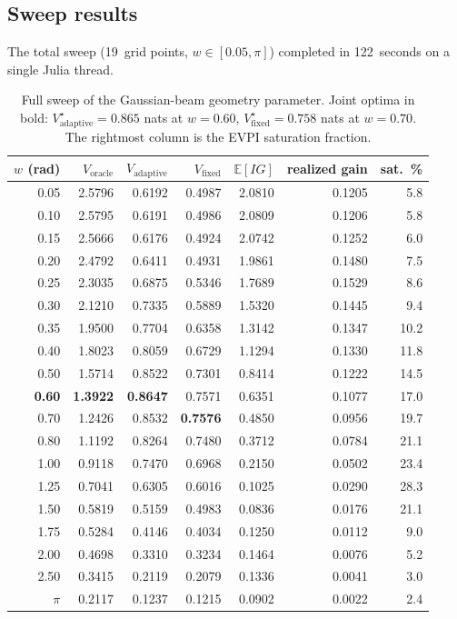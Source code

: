 \documentclass[11pt,a4paper]{article}
\newcommand{\E}{\mathbb{E}}
\begin{document}
\subsection{Sweep results}

The total sweep (19~grid points, $w \in [0.05, \pi]$) completed in 122~seconds on a single Julia thread.

\begin{table}[h!]
\centering
\begin{tabular}{@{}rrrrrrr@{}}
\toprule
$w$ (rad) & $V_{\text{oracle}}$ & $V_{\text{adaptive}}$ & $V_{\text{fixed}}$ & $\E[IG]$ & realized gain & sat.\ \% \\
\midrule
0.05 & 2.5796 & 0.6192 & 0.4987 & 2.0810 & 0.1205 & 5.8 \\
0.10 & 2.5795 & 0.6191 & 0.4986 & 2.0809 & 0.1206 & 5.8 \\
0.15 & 2.5666 & 0.6176 & 0.4924 & 2.0742 & 0.1252 & 6.0 \\
0.20 & 2.4792 & 0.6411 & 0.4931 & 1.9861 & 0.1480 & 7.5 \\
0.25 & 2.3035 & 0.6875 & 0.5346 & 1.7689 & 0.1529 & 8.6 \\
0.30 & 2.1210 & 0.7335 & 0.5889 & 1.5320 & 0.1445 & 9.4 \\
0.35 & 1.9500 & 0.7704 & 0.6358 & 1.3142 & 0.1347 & 10.2 \\
0.40 & 1.8023 & 0.8059 & 0.6729 & 1.1294 & 0.1330 & 11.8 \\
0.50 & 1.5714 & 0.8522 & 0.7301 & 0.8414 & 0.1222 & 14.5 \\
\textbf{0.60} & \textbf{1.3922} & \textbf{0.8647} & 0.7571 & 0.6351 & 0.1077 & 17.0 \\
0.70 & 1.2426 & 0.8532 & \textbf{0.7576} & 0.4850 & 0.0956 & 19.7 \\
0.80 & 1.1192 & 0.8264 & 0.7480 & 0.3712 & 0.0784 & 21.1 \\
1.00 & 0.9118 & 0.7470 & 0.6968 & 0.2150 & 0.0502 & 23.4 \\
1.25 & 0.7041 & 0.6305 & 0.6016 & 0.1025 & 0.0290 & 28.3 \\
1.50 & 0.5819 & 0.5159 & 0.4983 & 0.0836 & 0.0176 & 21.1 \\
1.75 & 0.5284 & 0.4146 & 0.4034 & 0.1250 & 0.0112 & 9.0 \\
2.00 & 0.4698 & 0.3310 & 0.3234 & 0.1464 & 0.0076 & 5.2 \\
2.50 & 0.3415 & 0.2119 & 0.2079 & 0.1336 & 0.0041 & 3.0 \\
$\pi$ & 0.2117 & 0.1237 & 0.1215 & 0.0902 & 0.0022 & 2.4 \\
\bottomrule
\end{tabular}
\caption{Full sweep of the Gaussian-beam geometry parameter.  Joint optima in bold: $V_{\text{adaptive}}^\star = 0.865$ nats at $w = 0.60$, $V_{\text{fixed}}^\star = 0.758$ nats at $w = 0.70$.  The rightmost column is the EVPI saturation fraction.}
\label{tab:joint_sweep}
\end{table}
\end{document}
